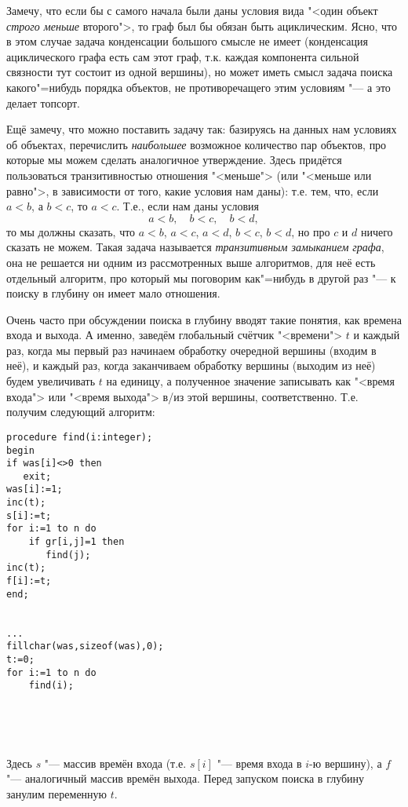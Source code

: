 Замечу, что если бы с самого начала были даны условия вида "<один объект \textit{строго меньше} второго">, то 
граф был бы обязан быть ациклическим. Ясно, что в этом случае задача конденсации большого смысле не имеет (конденсация
ациклического графа есть сам этот граф, т.к. каждая компонента сильной связности тут состоит из одной вершины), но может
иметь смысл задача поиска какого"=нибудь порядка объектов, не противоречащего этим условиям "--- а это делает топсорт.

Ещё замечу, что можно поставить задачу так: базируясь на данных нам условиях об объектах, перечислить 
\textit{наибольшее} возможное количество пар объектов, про которые мы можем сделать аналогичное утверждение.
Здесь придётся пользоваться транзитивностью отношения "<меньше"> (или "<меньше или равно">, в зависимости от того,
какие условия нам даны): т.е. тем, что, если $a<b$, а $b<c$, то $a<c$. Т.е., если нам даны условия
$$
a<b,\quad b<c,\quad b<d,
$$
то мы должны сказать, что $a<b$, $a<c$, $a<d$, $b<c$, $b<d$, но про $c$ и $d$ ничего сказать не можем. Такая задача
называется \textit{транзитивным замыканием графа}, она не решается ни одним из рассмотренных выше алгоритмов, для
неё есть отдельный алгоритм, про который мы поговорим как"=нибудь в другой раз "--- к поиску в глубину он имеет
мало отношения.

Очень часто при обсуждении поиска в глубину вводят такие понятия, как времена входа и выхода. А именно, заведём 
глобальный счётчик "<времени"> $t$ и каждый раз, когда мы первый раз начинаем обработку очередной вершины (входим
в неё), и каждый раз, когда заканчиваем обработку вершины (выходим из неё) будем увеличивать $t$ на единицу, а 
полученное значение записывать как "<время входа"> или "<время выхода"> в/из этой вершины, соответственно.
Т.е. получим следующий алгоритм:
\begin{codesample}\begin{verbatim}
procedure find(i:integer);
begin
if was[i]<>0 then
   exit;
was[i]:=1;
inc(t);
s[i]:=t;
for i:=1 to n do
    if gr[i,j]=1 then
       find(j);
inc(t);
f[i]:=t;
end;


...
fillchar(was,sizeof(was),0);
t:=0;
for i:=1 to n do
    find(i);





\end{verbatim}
\end{codesample}
Здесь $s$ "--- массив времён входа (т.е. $s[i]$ "--- время входа в $i$-ю вершину), а $f$ "--- аналогичный массив времён выхода. Перед запуском поиска в глубину занулим переменную $t$. 

